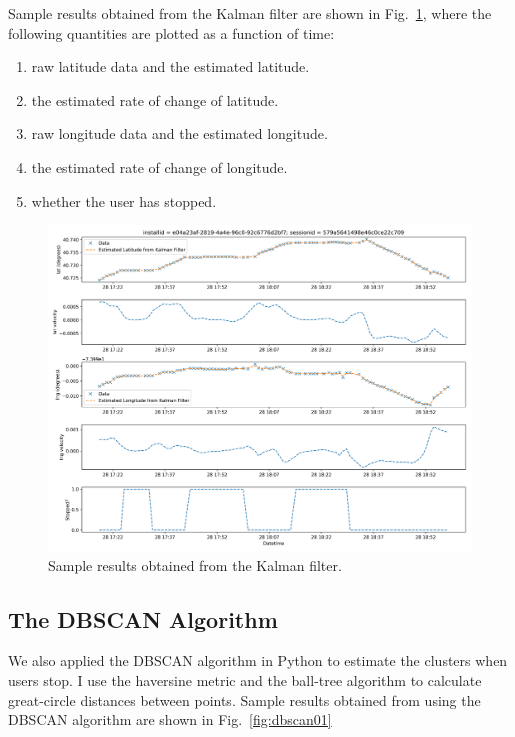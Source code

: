 \documentclass[12pt]{article}
\begin{document}
Sample results obtained from the Kalman filter are shown in Fig.~\ref{fig:kalman01}, where the following quantities are plotted as a function of time:
\begin{enumerate}
  \item raw latitude data and the estimated latitude.
  \item the estimated rate of change of latitude.
  \item raw longitude data and the estimated longitude.
  \item the estimated rate of change of longitude.
  \item whether the user has stopped.
\end{enumerate}

\begin{figure}[H]
\centering
\includegraphics[width=6.5in]{graphics/kalman01.png}
\caption{Sample results obtained from the Kalman filter.}
\label{fig:kalman01}
\end{figure}


\subsection{The DBSCAN Algorithm}
We also applied the DBSCAN algorithm in Python to estimate the clusters when users stop.  I use the haversine metric and the ball-tree algorithm to calculate great-circle distances between points.
Sample results obtained from using the DBSCAN algorithm are shown in Fig.~\ref{fig:dbscan01}
\end{document}
